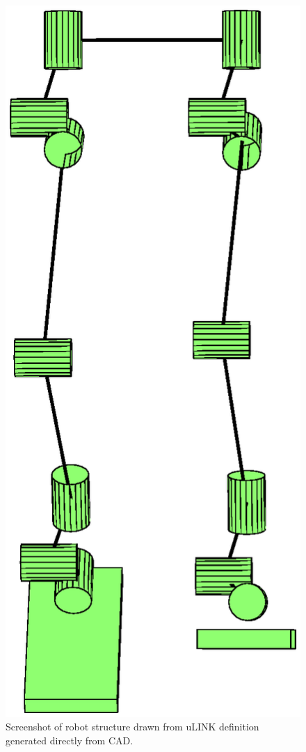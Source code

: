 \begin{figure}[!ht]
	\begin{center}
    \includegraphics[scale=0.6]{fig/design/ulinkdrawn.eps}
	\end{center}
  \caption{Screenshot of robot structure drawn from uLINK definition generated directly from CAD.}
  \label{fig:ulinkdrawn}
\end{figure}

